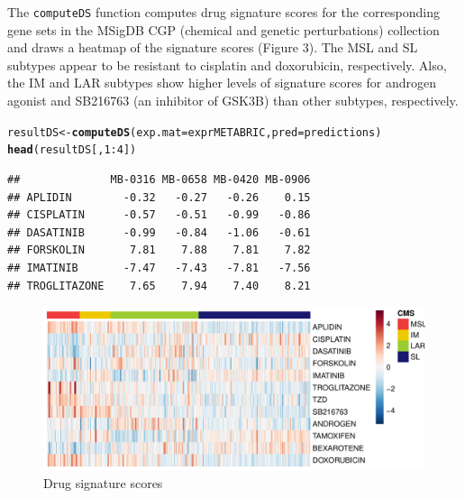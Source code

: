 \documentclass{article}\usepackage[]{graphicx}\usepackage[]{color}
\makeatletter
\def\maxwidth{ %
  \ifdim\Gin@nat@width>\linewidth
    \linewidth
  \else
    \Gin@nat@width
  \fi
}
\newcommand{\hlnum}[1]{\textcolor[rgb]{0.686,0.059,0.569}{#1}}%
\newcommand{\hlopt}[1]{\textcolor[rgb]{0,0,0}{#1}}%
\newcommand{\hlstd}[1]{\textcolor[rgb]{0.345,0.345,0.345}{#1}}%
\newcommand{\hlkwb}[1]{\textcolor[rgb]{0.69,0.353,0.396}{#1}}%
\newcommand{\hlkwc}[1]{\textcolor[rgb]{0.333,0.667,0.333}{#1}}%
\newcommand{\hlkwd}[1]{\textcolor[rgb]{0.737,0.353,0.396}{\textbf{#1}}}%
\newenvironment{kframe}{%
 \def\at@end@of@kframe{}%
 \ifinner\ifhmode%
  \def\at@end@of@kframe{\end{minipage}}%
  \begin{minipage}{\columnwidth}%
 \fi\fi%
 \def\FrameCommand##1{\hskip\@totalleftmargin \hskip-\fboxsep
 \colorbox{shadecolor}{##1}\hskip-\fboxsep
     \hskip-\linewidth \hskip-\@totalleftmargin \hskip\columnwidth}%
 \MakeFramed {\advance\hsize-\width
   \@totalleftmargin\z@ \linewidth\hsize
   \@setminipage}}%
 {\par\unskip\endMakeFramed%
 \at@end@of@kframe}
\newenvironment{knitrout}{}{} %
\makeatother
\begin{document}
The \texttt{computeDS} function computes drug signature scores for the corresponding gene sets in the MSigDB CGP (chemical and genetic perturbations) collection and draws a heatmap of the signature scores (Figure 3). The MSL and SL subtypes appear to be resistant to cisplatin and doxorubicin, respectively. Also, the IM and LAR subtypes show higher levels of signature scores for androgen agonist and SB216763 (an inhibitor of GSK3B) than other subtypes, respectively.
\begin{knitrout}
\color{fgcolor}\begin{kframe}
\begin{alltt}
\hlstd{resultDS} \hlkwb{<-} \hlkwd{computeDS}\hlstd{(}\hlkwc{exp.mat} \hlstd{= exprMETABRIC,} \hlkwc{pred} \hlstd{= predictions)}
\hlkwd{head}\hlstd{(resultDS[,}\hlnum{1}\hlopt{:}\hlnum{4}\hlstd{])}
\end{alltt}
\begin{verbatim}
##              MB-0316 MB-0658 MB-0420 MB-0906
## APLIDIN        -0.32   -0.27   -0.26    0.15
## CISPLATIN      -0.57   -0.51   -0.99   -0.86
## DASATINIB      -0.99   -0.84   -1.06   -0.61
## FORSKOLIN       7.81    7.88    7.81    7.82
## IMATINIB       -7.47   -7.43   -7.81   -7.56
## TROGLITAZONE    7.65    7.94    7.40    8.21
\end{verbatim}
\end{kframe}\begin{figure}[H]
\includegraphics[width=\maxwidth]{figure/ds-1} \caption[Drug signature scores]{Drug signature scores}\label{fig:ds}
\end{figure}


\end{knitrout}

\end{document}
